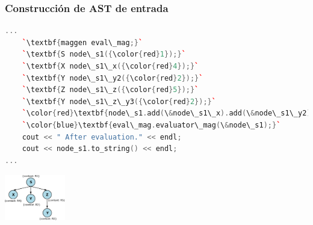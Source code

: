 \documentclass[10pt]{beamer}
\begin{document}
\begin{frame}[fragile]
\frametitle{Construcción de AST de entrada}

\begin{lstlisting}[columns=fullflexible, basicstyle=\scriptsize, language=c++]
...     
    `\textbf{maggen eval\_mag;}`
    `\textbf{S node\_s1({\color{red}1});}`
    `\textbf{X node\_s1\_x({\color{red}4});}`
    `\textbf{Y node\_s1\_y2({\color{red}2});}`
    `\textbf{Z node\_s1\_z({\color{red}5});}`
    `\textbf{Y node\_s1\_z\_y3({\color{red}2});}`
    `\color{red}\textbf{node\_s1.add(\&node\_s1\_x).add(\&node\_s1\_y2).add(\&(node\_s1\_z.add(\&node\_s1\_z\_y3)));}`
    `\color{blue}\textbf{eval\_mag.evaluator\_mag(\&node\_s1);}`
    cout << " After evaluation." << endl;
    cout << node_s1.to_string() << endl;
...
\end{lstlisting}

\begin{center}
\includegraphics[width=100px, height=76px]{./ast.png}
\end{center}

\end{frame}


\end{document}
